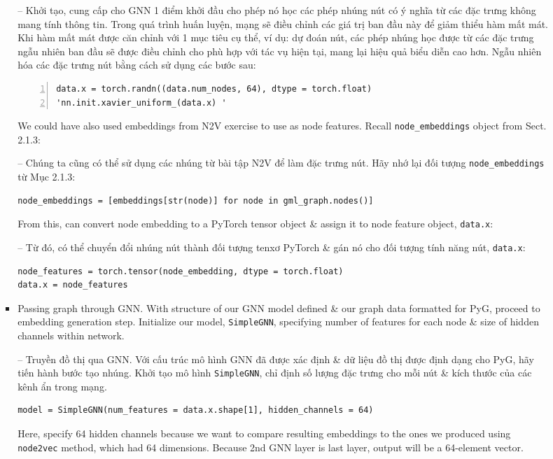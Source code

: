\documentclass{article}
\begin{document}
\begin{itemize}
\begin{itemize}
\begin{itemize}
\begin{itemize}
               -- Khởi tạo, cung cấp cho GNN 1 điểm khởi đầu cho phép nó học các phép nhúng nút có ý nghĩa từ các đặc trưng không mang tính thông tin. Trong quá trình huấn luyện, mạng sẽ điều chỉnh các giá trị ban đầu này để giảm thiểu hàm mất mát. Khi hàm mất mát được căn chỉnh với 1 mục tiêu cụ thể, ví dụ: dự đoán nút, các phép nhúng học được từ các đặc trưng ngẫu nhiên ban đầu sẽ được điều chỉnh cho phù hợp với tác vụ hiện tại, mang lại hiệu quả biểu diễn cao hơn. Ngẫu nhiên hóa các đặc trưng nút bằng cách sử dụng các bước sau:
               \begin{Verbatim}[numbers=left,xleftmargin=5mm]
data.x = torch.randn((data.num_nodes, 64), dtype = torch.float)
'nn.init.xavier_uniform_(data.x) '
               \end{Verbatim}
               We could have also used embeddings from N2V exercise to use as node features. Recall \verb|node_embeddings| object from Sect. 2.1.3:

               -- Chúng ta cũng có thể sử dụng các nhúng từ bài tập N2V để làm đặc trưng nút. Hãy nhớ lại đối tượng \verb|node_embeddings| từ Mục 2.1.3:
               \begin{verbatim}
node_embeddings = [embeddings[str(node)] for node in gml_graph.nodes()]
               \end{verbatim}
               From this, can convert node embedding to a PyTorch tensor object \& assign it to node feature object, {\tt data.x}:

               -- Từ đó, có thể chuyển đổi nhúng nút thành đối tượng tenxơ PyTorch \& gán nó cho đối tượng tính năng nút, {\tt data.x}:
               \begin{verbatim}
node_features = torch.tensor(node_embedding, dtype = torch.float)
data.x = node_features
               \end{verbatim}
               \item {\sf Passing graph through GNN.} With structure of our GNN model defined \& our graph data formatted for PyG, proceed to embedding generation step. Initialize our model, {\tt SimpleGNN}, specifying number of features for each node \& size of hidden channels within network.

               -- {\sf Truyền đồ thị qua GNN.} Với cấu trúc mô hình GNN đã được xác định \& dữ liệu đồ thị được định dạng cho PyG, hãy tiến hành bước tạo nhúng. Khởi tạo mô hình {\tt SimpleGNN}, chỉ định số lượng đặc trưng cho mỗi nút \& kích thước của các kênh ẩn trong mạng.
               \begin{verbatim}
model = SimpleGNN(num_features = data.x.shape[1], hidden_channels = 64)
               \end{verbatim}
               Here, specify 64 hidden channels because we want to compare resulting embeddings to the ones we produced using {\tt node2vec} method, which had 64 dimensions. Because 2nd GNN layer is last layer, output will be a 64-element vector.


\end{itemize}
\end{itemize}
\end{itemize}
\end{itemize}
\end{document}
